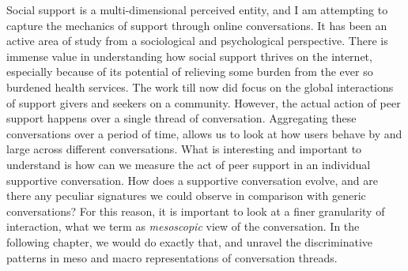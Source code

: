 Social support is a multi-dimensional perceived entity, and I am attempting to capture the mechanics of support through online conversations. It has been an active area of study from a sociological and psychological perspective. 
There is immense value in understanding how social support thrives on the internet, especially because of its potential of relieving some burden from the ever so burdened health services. The work till now did focus on the global interactions of support givers and seekers on a community. However, the actual action of peer support happens over a single thread of conversation. Aggregating these conversations over a period of time, allows us to look at how users behave by and large across different conversations. What is interesting and important to understand is how can we measure the act of peer support in an individual supportive conversation. How does a supportive conversation evolve, and are there any peculiar signatures we could observe in comparison with generic conversations? For this reason, it is important to look at a finer granularity of interaction, what we term as \textsl{mesoscopic} view of the conversation. In the following chapter, we would do exactly that, and unravel the discriminative patterns in meso and macro representations of conversation threads. 
